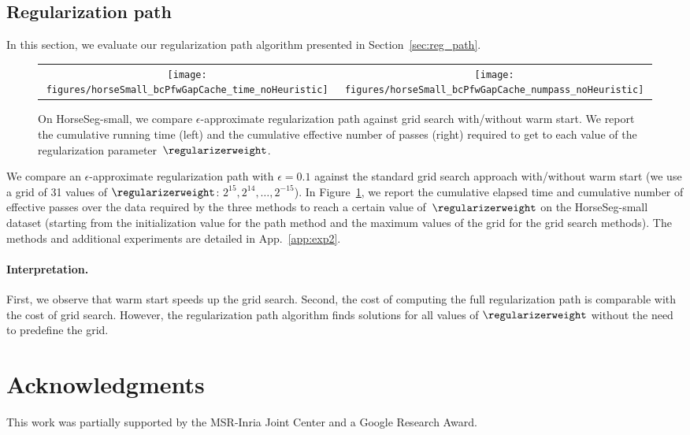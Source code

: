 \documentclass{article}
\begin{document}
\subsection{Regularization path}\label{subsec:reg_path}
In this section, we evaluate our regularization path algorithm presented in Section~\ref{sec:reg_path}.
\begin{figure}
\vspace{-1mm}
     \begin{tabular}{c@{$\:\:$}c}
         \texttt{[image: figures/horseSmall\_bcPfwGapCache\_time\_noHeuristic]} &
         \texttt{[image: figures/horseSmall\_bcPfwGapCache\_numpass\_noHeuristic]}\\[-0.3cm]
        \end{tabular}
        \caption{
            \label{fig:exp2_horseSmall} On HorseSeg-small, we compare $\epsilon$-approximate regularization path against grid search with/without warm start. 
            We report the cumulative running time (left) and the cumulative effective number of passes (right) required to get to each value of the regularization parameter~$\regularizerweight$.
            \vspace{-2mm} 
        }
\end{figure}
We compare an $\epsilon$-approximate regularization path with $\epsilon=0.1$ against the standard grid search approach with/without warm start (we use a grid of 31 values of $\regularizerweight$: $2^{15},2^{14},\dots,2^{-15}$).
In Figure~\ref{fig:exp2_horseSmall}, we report the cumulative elapsed time and cumulative number of effective passes over the data required by the three methods to reach a certain value of~$\regularizerweight$ on the HorseSeg-small dataset (starting from the initialization value for the path method and the maximum values of the grid for the grid search methods).
The methods and additional experiments are detailed in App.~\ref{app:exp2}.

\paragraph{Interpretation.} First, we observe that warm start speeds up the grid search.
Second, the cost of computing the full regularization path is comparable with the cost of grid search.
However, the regularization path algorithm finds solutions for all values of $\regularizerweight$ without the need to predefine the grid.
%
%
%
%

\section*{Acknowledgments} 
%
This work was partially supported by the MSR-Inria Joint Center and a Google Research Award.
%
%
%
%
%
%
%
%
%
%
%
%
%
%
%
%
%
%
%
%
%
%
%
%
%
%
%
%
%
%
\end{document}
